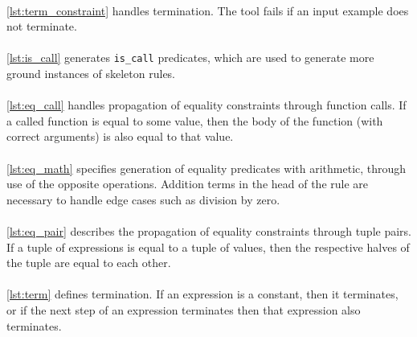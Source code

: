  
\mbox{} \\
\ref{lst:term_constraint} handles termination. The tool fails if an input example does not terminate.\\

 
\mbox{} \\
\ref{lst:is_call} generates \lstinline{is_call} predicates, which are used to generate more ground instances of skeleton rules. \\ %

 
\mbox{} \\
\ref{lst:eq_call} handles propagation of equality constraints through function calls. If a called function is equal to some value, then the body of the function (with correct arguments) is also equal to that value. \\

 
\mbox{} \\
\ref{lst:eq_math} specifies generation of equality predicates with arithmetic, through use of the opposite operations. Addition terms in the head of the rule are necessary to handle edge cases such as division by zero. \\


\mbox{}\\
\ref{lst:eq_pair} describes the propagation of equality constraints through tuple pairs. If a tuple of expressions is equal to a tuple of values, then the respective halves of the tuple are equal to each other. \\

 
\mbox{} \\
\ref{lst:term} defines termination. If an expression is a constant, then it terminates, or if the next step of an expression terminates then that expression also terminates. \\

